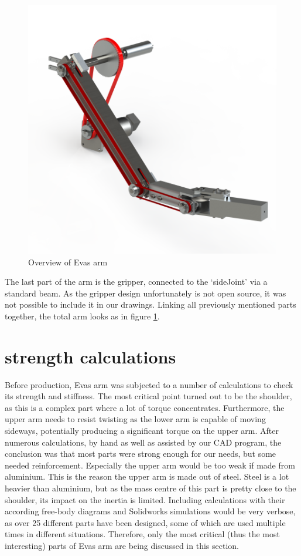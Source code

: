 \documentclass[technical_document.tex]{subfiles}
\begin{document}
\begin{figure}[ht!]
	\centering
	\mbox{\includegraphics[scale=1.0]{Images/overview.png}}
	\caption{Overview of Eva\textquotesingle{}s arm}
	\label{fig:overview}
\end{figure}

The last part of the  arm is the gripper, connected to the ‘sideJoint’ via a standard beam. As the gripper design unfortunately is not open source, it was not possible to include it in our drawings. Linking all previously mentioned parts together, the total arm looks as in figure \ref{fig:overview}.


\section{strength calculations}

Before production, Eva\textquotesingle{}s arm was subjected to a number of calculations to check its strength and stiffness. The most critical point turned out to be the shoulder, as this is a complex part where a lot of torque concentrates. Furthermore, the upper arm needs to resist twisting as the lower arm is capable of moving sideways, potentially producing a significant torque on the upper arm. After numerous calculations, by hand as well as assisted by our CAD program, the conclusion was that most parts were  strong enough for our needs, but some needed reinforcement. Especially the upper arm would be too weak if made from aluminium. This is the reason the upper arm is made out of steel. Steel is a lot heavier than aluminium, but as the mass centre of this part is pretty close to the shoulder, its impact on the inertia is limited.
Including calculations with their according free-body diagrams and Solidworks simulations would be very verbose, as over 25 different parts have been designed, some of which are used multiple times in different situations. Therefore, only the most critical (thus the most interesting) parts of Eva\textquotesingle{}s arm are being discussed in this section.
\end{document}
